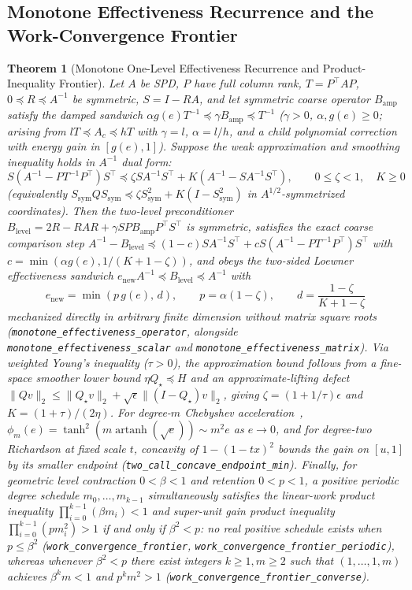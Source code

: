 \documentclass[10pt]{article}
\newtheorem{theorem}{Theorem}
\begin{document}
\subsection{Monotone Effectiveness Recurrence and the Work-Convergence Frontier}
\begin{theorem}[Monotone One-Level Effectiveness Recurrence and Product-Inequality Frontier]
Let $A$ be SPD, $P$ have full column rank, $T = P^\top A P$, $0 \preceq R \preceq A^{-1}$ be symmetric, $S = I - R A$, and let symmetric coarse operator $B_{\mathrm{amp}}$ satisfy the damped sandwich $\alpha g(e) T^{-1} \preceq \gamma B_{\mathrm{amp}} \preceq T^{-1}$ ($\gamma > 0$, $\alpha, g(e) \ge 0$; arising from $l T \preceq A_c \preceq h T$ with $\gamma = l$, $\alpha = l/h$, and a child polynomial correction with energy gain in $[g(e), 1]$). Suppose the weak approximation and smoothing inequality holds in $A^{-1}$ dual form:
\[
  S (A^{-1} - P T^{-1} P^\top) S^\top \preceq \zeta S A^{-1} S^\top + K (A^{-1} - S A^{-1} S^\top), \qquad 0 \le \zeta < 1, \quad K \ge 0
\]
(equivalently $S_{\mathrm{sym}} Q S_{\mathrm{sym}} \preceq \zeta S_{\mathrm{sym}}^2 + K (I - S_{\mathrm{sym}}^2)$ in $A^{1/2}$-symmetrized coordinates). Then the two-level preconditioner $B_{\mathrm{level}} = 2 R - R A R + \gamma S P B_{\mathrm{amp}} P^\top S^\top$ is symmetric, satisfies the exact coarse comparison step $A^{-1} - B_{\mathrm{level}} \preceq (1 - c) S A^{-1} S^\top + c S (A^{-1} - P T^{-1} P^\top) S^\top$ with $c = \min(\alpha g(e), 1/(K + 1 - \zeta))$, and obeys the two-sided Loewner effectiveness sandwich $e_{\mathrm{new}} A^{-1} \preceq B_{\mathrm{level}} \preceq A^{-1}$ with
\[
  e_{\mathrm{new}} = \min\!\left(p\,g(e),\, d\right), \qquad p = \alpha(1-\zeta), \qquad d = \frac{1-\zeta}{K + 1 - \zeta}
\]
mechanized directly in arbitrary finite dimension without matrix square roots (\texttt{monotone\_effectiveness\_operator}, alongside \texttt{monotone\_effectiveness\_scalar} and \texttt{monotone\_effectiveness\_matrix}). Via weighted Young's inequality ($\tau > 0$), the approximation bound follows from a fine-space smoother lower bound $\eta Q_\star \preceq H$ and an approximate-lifting defect $\|Q v\|_2 \le \|Q_\star v\|_2 + \sqrt{\epsilon}\|(I - Q_\star)v\|_2$, giving $\zeta = (1 + 1/\tau)\epsilon$ and $K = (1+\tau)/(2\eta)$. For degree-$m$ Chebyshev acceleration~\cite{axelsson1989amli,notay2008kcycle,napov2012amli}, $\phi_m(e) = \tanh^2(m \operatorname{artanh}(\sqrt{e})) \sim m^2 e$ as $e \to 0$, and for degree-two Richardson at fixed scale $t$, concavity of $1 - (1 - t x)^2$ bounds the gain on $[u,1]$ by its smaller endpoint (\texttt{two\_call\_concave\_endpoint\_min}). Finally, for geometric level contraction $0 < \beta < 1$ and retention $0 < p < 1$, a positive periodic degree schedule $m_0,\dots,m_{k-1}$ simultaneously satisfies the linear-work product inequality $\prod_{i=0}^{k-1}(\beta m_i) < 1$ and super-unit gain product inequality $\prod_{i=0}^{k-1}(p m_i^2) > 1$ if and only if $\beta^2 < p$: no real positive schedule exists when $p \le \beta^2$ (\texttt{work\_convergence\_frontier}, \texttt{work\_convergence\_frontier\_periodic}), whereas whenever $\beta^2 < p$ there exist integers $k \ge 1, m \ge 2$ such that $(1,\dots,1,m)$ achieves $\beta^k m < 1$ and $p^k m^2 > 1$ (\texttt{work\_convergence\_frontier\_converse}).

\end{theorem}
\end{document}
